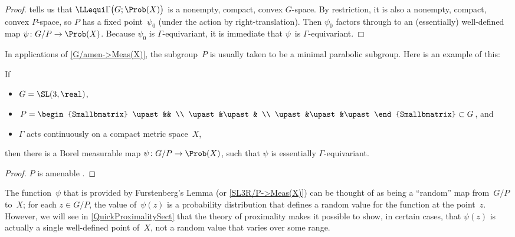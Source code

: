 \begin{proof}
%
 tells us that $\LLequi\Gamma \bigl( G;\Prob(X) \bigr)$
is a nonempty, compact, convex $G$-space. By restriction, it is also a nonempty, compact, convex $P$-space, so $P$ has a fixed point~$\psi_0$ (under the action by right-translation). 
Then $\psi_0$ factors through
to an (essentially) well-defined map $\psi \colon G/P \to
\Prob(X)$. Because $\psi_0$ is $\Gamma$-equivariant, it is
immediate that $\psi$~is $\Gamma$-equivariant.
 \end{proof}
 
In applications of \cref{G/amen->Meas(X)}, the subgroup~$P$ is usually taken to be a minimal parabolic subgroup. %
Here is an example of this:

\begin{cor} \label{SL3R/P->Meas(X)}
If
\noprelistbreak
	\begin{itemize}
	\item $G = \SL(3,\real)$,
	\item $ P
	 = \begin{Smallbmatrix} \upast&& \\ \upast&\upast& \\ \upast&\upast&\upast \end{Smallbmatrix}
	 \subset G $,
	 and
	 \item $\Gamma$ acts continuously on a compact metric
space~$X$,
 \end{itemize}
 then there is a Borel measurable map $\psi \colon G/P \to
\Prob(X)$, such that $\psi$ is essentially
$\Gamma$-equivariant.
 \end{cor}

\begin{proof}
$P$ is amenable .
\end{proof}

\begin{rem} The function~$\psi$ that is provided by Furstenberg's Lemma  (or \cref{SL3R/P->Meas(X)}) can be thought of as being a ``random'' map from~$G/P$ to~$X$; for each $z \in G/P$, the value of~$\psi(z)$ is a probability distribution that defines a random value for the function at the point~$z$. However, we will see in \cref{QuickProximalitySect} that the theory of proximality makes it possible to show, in certain cases, that $\psi(z)$ is actually a single well-defined point of~$X$, not a random value that varies over some range.
\end{rem}

